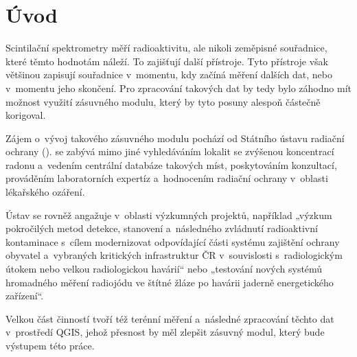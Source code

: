 \chapter{Úvod}
\label{1-uvod}

Scintilační spektrometry měří radioaktivitu, ale nikoli zeměpisné souřadnice, které těmto hodnotám
náleží. To zajišťují další přístroje. Tyto přístroje však většinou zapisují souřadnice
v~momentu, kdy začíná měření dalších dat, nebo v~momentu jeho skončení. Pro zpracování takových dat
by tedy bylo záhodno mít možnost využití zásuvného modulu, který by tyto posuny alespoň částečně korigoval. 

Zájem o~vývoj takového zásuvného modulu pochází od Státního ústavu radiační ochrany ().
 se zabývá mimo jiné vyhledáváním lokalit se zvýšenou koncentrací radonu a~vedením centrální
databáze takových míst, poskytováním konzultací, prováděním laboratorních expertíz a~hodnocením
radiační ochrany v~oblasti lékařského ozáření. 

Ústav se rovněž angažuje v~oblasti výzkumných projektů, například „výzkum pokročilých metod detekce,
stanovení a~následného zvládnutí radioaktivní kontami\-nace s~cílem modernizovat odpovídající části
systému zajištění ochrany obyvatel a~vybraných kritických infrastruktur ČR v~souvislosti
s~radiologickým útokem nebo velkou radiologickou havárií“ nebo „testování nových systémů
hromadného měření radiojódu ve štítné žláze po havárii jaderně energetického zařízení“. \cite{surovyzkum}

Velkou část činností  tvoří též terénní měření a~následné zpracování
těchto dat v~prostředí QGIS, jehož přesnost by měl zlepšit zásuvný modul, který bude výstupem této práce.


